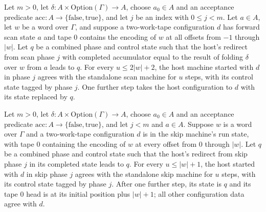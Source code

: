 \begin{theorem}
\label{Turing.rt_find_scan_phase}
\leanok
{}
Let $m>0$, let $\delta:A\times\mathrm{Option}(\Gamma)\to A$, choose $a_0\in A$ and an
acceptance predicate $\mathrm{acc}:A\to\{\mathrm{false},\mathrm{true}\}$, and let $j$ be
an index with $0\le j<m$. Let $a\in A$, let $w$ be a word over $\Gamma$, and suppose a
two-work-tape configuration $d$ has forward scan state $a$ and tape 0 contains the
encoding of $w$ at all offsets from $-1$ through $|w|$. Let $q$ be a combined phase and
control state such that the host's redirect from scan phase $j$ with completed
accumulator equal to the result of folding $\delta$ over $w$ from $a$ leads to $q$. For
every $u\le 2|w|+2$, the host machine started with $d$ in phase $j$ agrees with the
standalone scan machine for $u$ steps, with its control state tagged by phase $j$. One
further step takes the host configuration to $d$ with its state replaced by $q$.
\end{theorem}

\begin{theorem}
\label{Turing.rt_find_skip_phase}
\leanok
{}
Let $m>0$, let $\delta:A\times\mathrm{Option}(\Gamma)\to A$, choose $a_0\in A$ and an
acceptance predicate $\mathrm{acc}:A\to\{\mathrm{false},\mathrm{true}\}$, and let $j<m$
and $a\in A$. Suppose $w$ is a word over $\Gamma$ and a two-work-tape configuration $d$
is in the skip machine's run state, with tape 0 containing the encoding of $w$ at every
offset from $0$ through $|w|$. Let $q$ be a combined phase and control state such that
the host's redirect from skip phase $j$ in its completed state leads to $q$. For every
$u\le |w|+1$, the host started with $d$ in skip phase $j$ agrees with the standalone
skip machine for $u$ steps, with its control state tagged by phase $j$. After one
further step, its state is $q$ and its tape 0 head is at its initial position plus
$|w|+1$; all other configuration data agree with $d$.
\end{theorem}

